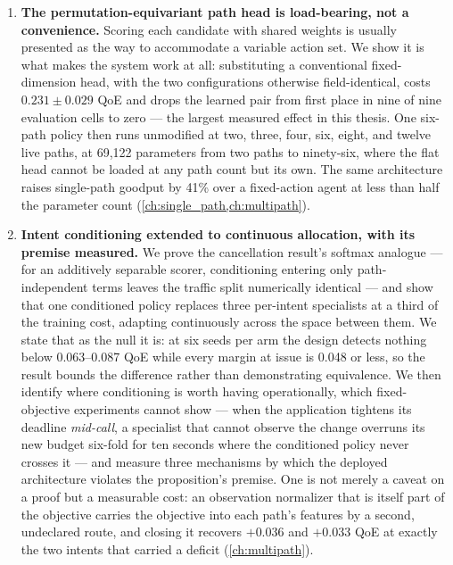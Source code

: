 \begin{enumerate}
  \item \textbf{The permutation-equivariant path head is load-bearing, not a convenience.} Scoring each
  candidate with shared weights is usually presented as the way to accommodate a variable action set. We
  show it is what makes the system work at all: substituting a conventional fixed-dimension head, with
  the two configurations otherwise field-identical, costs $0.231 \pm 0.029$ QoE and drops the learned
  pair from first place in nine of nine evaluation cells to zero --- the largest measured effect in this
  thesis. One six-path policy then runs unmodified at two, three, four, six, eight, and twelve live
  paths, at 69,122 parameters from two paths to ninety-six, where the flat head cannot be loaded at any
  path count but its own. The same architecture raises single-path goodput by 41\% over a fixed-action
  agent at less than half the parameter count (\cref{ch:single_path,ch:multipath}).

  \item \textbf{Intent conditioning extended to continuous allocation, with its premise measured.} We
  prove the cancellation result's softmax analogue --- for an additively separable scorer, conditioning
  entering only path-independent terms leaves the traffic split numerically identical --- and show that
  one conditioned policy replaces three per-intent specialists at a third of the training cost, adapting
  continuously across the space between them. We state that as the null it is: at six seeds per arm the
  design detects nothing below 0.063--0.087 QoE while every margin at issue is 0.048 or less, so the
  result bounds the difference rather than demonstrating equivalence. We then identify where conditioning
  is worth having operationally, which fixed-objective experiments cannot show --- when the application
  tightens its deadline \emph{mid-call}, a specialist that cannot observe the change overruns its new
  budget six-fold for ten seconds where the conditioned policy never crosses it --- and measure three
  mechanisms by which the deployed architecture violates the proposition's premise. One is not merely a
  caveat on a proof but a measurable cost: an observation normalizer that is itself part of the objective
  carries the objective into each path's features by a second, undeclared route, and closing it recovers
  $+0.036$ and $+0.033$ QoE at exactly the two intents that carried a deficit (\cref{ch:multipath}).


\end{enumerate}

